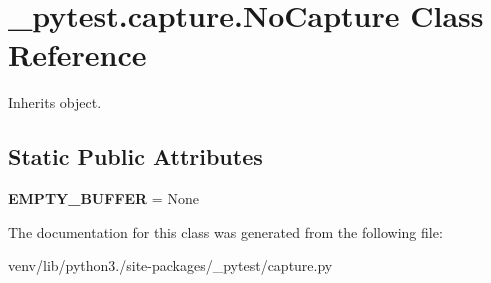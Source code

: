 \hypertarget{class__pytest_1_1capture_1_1_no_capture}{}\section{\+\_\+pytest.\+capture.\+No\+Capture Class Reference}
\label{class__pytest_1_1capture_1_1_no_capture}


Inherits object.

\subsection*{Static Public Attributes}
\begin{DoxyCompactItemize}
\item 
\mbox{\label{class__pytest_1_1capture_1_1_no_capture_a36101329443b1df7ae3b11dd210bfbda}} 
{\bfseries E\+M\+P\+T\+Y\+\_\+\+B\+U\+F\+F\+ER} = None
\end{DoxyCompactItemize}


The documentation for this class was generated from the following file\+:\begin{DoxyCompactItemize}
\item 
venv/lib/python3./site-\/packages/\+\_\+pytest/capture.\+py\end{DoxyCompactItemize}
